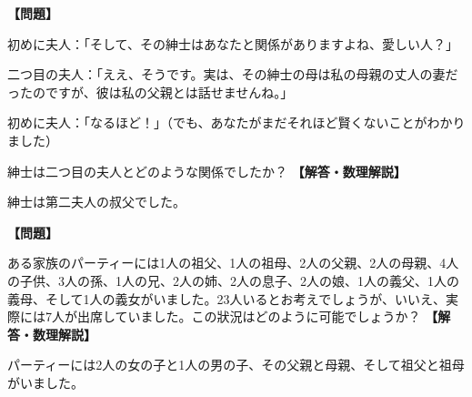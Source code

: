 \documentclass[10pt,a4paper,oneside,openany]{ltjsbook}
\begin{document}
\begin{tcolorbox}[colback=softblue,colframe=primaryblue,title=\textbf{第 53 問：Tube 鉄道で聞かされたこと （原題: HEARD ON THE TUBE RAILWAY.）},arc=2mm,boxrule=1pt,breakable]
\textbf{【問題】}\par\vspace{0.3em}
初めに夫人：「そして、その紳士はあなたと関係がありますよね、愛しい人？」

二つ目の夫人：「ええ、そうです。実は、その紳士の母は私の母親の丈人の妻だったのですが、彼は私の父親とは話せませんね。」

初めに夫人：「なるほど！」（でも、あなたがまだそれほど賢くないことがわかりました）

紳士は二つ目の夫人とどのような関係でしたか？
\tcblower
\textbf{【解答・数理解説】}\par\vspace{0.3em}
紳士は第二夫人の叔父でした。
\end{tcolorbox}

\begin{tcolorbox}[colback=softblue,colframe=primaryblue,title=\textbf{第 54 問：家族のパーティー （原題: A FAMILY PARTY.）},arc=2mm,boxrule=1pt,breakable]
\textbf{【問題】}\par\vspace{0.3em}
ある家族のパーティーには1人の祖父、1人の祖母、2人の父親、2人の母親、4人の子供、3人の孫、1人の兄、2人の姉、2人の息子、2人の娘、1人の義父、1人の義母、そして1人の義女がいました。23人いるとお考えでしょうが、いいえ、実際には7人が出席していました。この狀況はどのように可能でしょうか？
\tcblower
\textbf{【解答・数理解説】}\par\vspace{0.3em}
パーティーには2人の女の子と1人の男の子、その父親と母親、そして祖父と祖母がいました。
\end{tcolorbox}
\end{document}
